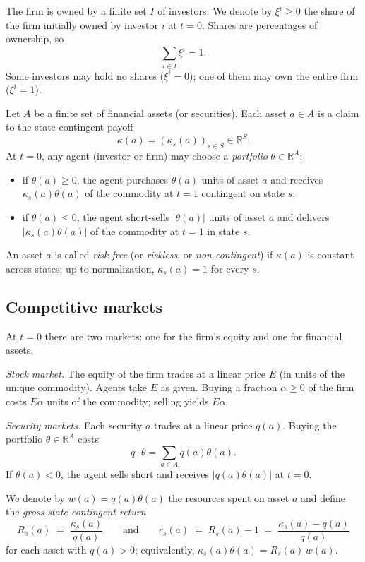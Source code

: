 \documentclass[11pt,a4paper]{article}
\def\R{\mathbb{R}}
\def\leq{\leqslant}
\def\geq{\geqslant}
\theoremstyle{plain}
\theoremstyle{definition}
\theoremstyle{remark}
\begin{document}
The firm is owned by a finite set $I$ of investors. We denote by $\xi^i\geq 0$ the share of the firm initially owned by investor $i$ at $t=0$. Shares are percentages of ownership, so
\[
  \sum_{i\in I} \xi^i = 1.
\]
Some investors may hold no shares ($\xi^i=0$); one of them may own the entire firm ($\xi^i=1$).

Let $A$ be a finite set of financial assets (or securities). Each asset $a\in A$ is a claim to the state-contingent payoff
\[
  \kappa(a) = (\kappa_s(a))_{s\in S} \in \R^S.
\]
At $t=0$, any agent (investor or firm) may choose a \emph{portfolio} $\theta\in\R^A$:
\begin{itemize}
  \item if $\theta(a)\geq 0$, the agent purchases $\theta(a)$ units of asset $a$ and receives $\kappa_s(a)\theta(a)$ of the commodity at $t=1$ contingent on state $s$;
  \item if $\theta(a)\leq 0$, the agent short-sells $|\theta(a)|$ units of asset $a$ and delivers $|\kappa_s(a)\theta(a)|$ of the commodity at $t=1$ in state $s$.
\end{itemize}
An asset $a$ is called \emph{risk-free} (or \emph{riskless}, or \emph{non-contingent}) if $\kappa(a)$ is constant across states; up to normalization, $\kappa_s(a)=1$ for every $s$.

\subsection{Competitive markets}

At $t=0$ there are two markets: one for the firm's equity and one for financial assets.

\emph{Stock market.} The equity of the firm trades at a linear price $E$ (in units of the unique commodity). Agents take $E$ as given. Buying a fraction $\alpha \geq 0$ of the firm costs $E\alpha$ units of the commodity; selling yields $E\alpha$.

\emph{Security markets.} Each security $a$ trades at a linear price $q(a)$. Buying the portfolio $\theta\in\R^A$ costs
\[
  q\cdot\theta = \sum_{a\in A} q(a)\theta(a).
\]
If $\theta(a)<0$, the agent sells short and receives $|q(a)\theta(a)|$ at $t=0$.

We denote by $w(a) = q(a)\theta(a)$ the resources spent on asset $a$ and define the \emph{gross state-contingent return}
\[
  R_s(a) \;=\; \frac{\kappa_s(a)}{q(a)}
  \qquad\text{and}\qquad
  r_s(a) \;=\; R_s(a) - 1 \;=\; \frac{\kappa_s(a) - q(a)}{q(a)}
\]
for each asset with $q(a)>0$; equivalently, $\kappa_s(a)\theta(a) = R_s(a)\,w(a)$.
\end{document}
